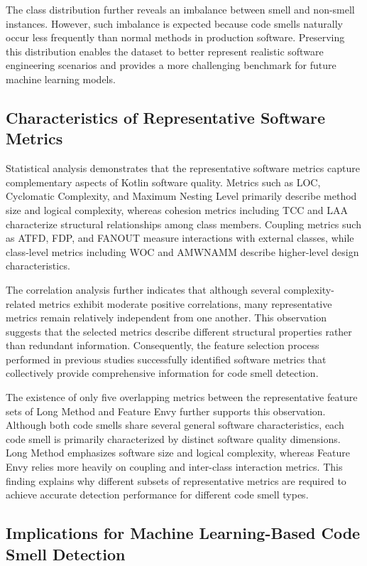 \documentclass[]{einformatica}
\begin{document}
The class distribution further reveals an imbalance between smell and non-smell instances. However, such imbalance is expected because code smells naturally occur less frequently than normal methods in production software. Preserving this distribution enables the dataset to better represent realistic software engineering scenarios and provides a more challenging benchmark for future machine learning models.

\subsection{Characteristics of Representative Software Metrics}

Statistical analysis demonstrates that the representative software metrics capture complementary aspects of Kotlin software quality. Metrics such as LOC, Cyclomatic Complexity, and Maximum Nesting Level primarily describe method size and logical complexity, whereas cohesion metrics including TCC and LAA characterize structural relationships among class members. Coupling metrics such as ATFD, FDP, and FANOUT measure interactions with external classes, while class-level metrics including WOC and AMWNAMM describe higher-level design characteristics.

The correlation analysis further indicates that although several complexity-related metrics exhibit moderate positive correlations, many representative metrics remain relatively independent from one another. This observation suggests that the selected metrics describe different structural properties rather than redundant information. Consequently, the feature selection process performed in previous studies successfully identified software metrics that collectively provide comprehensive information for code smell detection.

The existence of only five overlapping metrics between the representative feature sets of Long Method and Feature Envy further supports this observation. Although both code smells share several general software characteristics, each code smell is primarily characterized by distinct software quality dimensions. Long Method emphasizes software size and logical complexity, whereas Feature Envy relies more heavily on coupling and inter-class interaction metrics. This finding explains why different subsets of representative metrics are required to achieve accurate detection performance for different code smell types.

\subsection{Implications for Machine Learning-Based Code Smell Detection}
\end{document}

